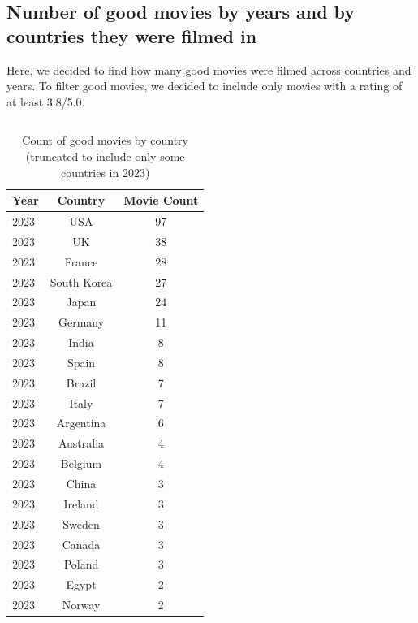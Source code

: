 \documentclass{Configuration_Files/PoliMi3i_thesis}
\begin{document}
\newpage
\subsection{Number of good movies by years and by  countries they were filmed in}

Here, we decided to find how many good movies were filmed across countries and years. To filter good movies, we decided to include only movies with a rating of at least 3.8/5.0.
\inputminted[frame=single,framesep=10pt,breaklines]{cypher}{letterboxd/queries/query7.cypher}

\begin{table}[H]
\centering
\caption{Count of good movies by country (truncated to include only some countries in 2023)}
\begin{tabular}{|l|c|c|}
\hline
\textbf{Year} & \textbf{Country}     & \textbf{Movie Count} \\
\hline
2023          & USA                 & 97                   \\
2023          & UK                  & 38                   \\
2023          & France              & 28                   \\
2023          & South Korea         & 27                   \\
2023          & Japan               & 24                   \\
2023          & Germany             & 11                   \\
2023          & India               & 8                    \\
2023          & Spain               & 8                    \\
2023          & Brazil              & 7                    \\
2023          & Italy               & 7                    \\
2023          & Argentina           & 6                    \\
2023          & Australia           & 4                    \\
2023          & Belgium             & 4                    \\
2023          & China               & 3                    \\
2023          & Ireland             & 3                    \\
2023          & Sweden              & 3                    \\
2023          & Canada              & 3                    \\
2023          & Poland              & 3                    \\
2023          & Egypt               & 2                    \\
2023          & Norway              & 2                    \\ \hline
\end{tabular}
\end{table}
\end{document}
